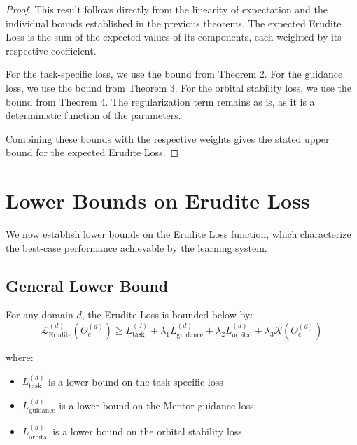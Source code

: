 \begin{proof}
This result follows directly from the linearity of expectation and the individual bounds established in the previous theorems. The expected Erudite Loss is the sum of the expected values of its components, each weighted by its respective coefficient.

For the task-specific loss, we use the bound from Theorem 2. For the guidance loss, we use the bound from Theorem 3. For the orbital stability loss, we use the bound from Theorem 4. The regularization term remains as is, as it is a deterministic function of the parameters.

Combining these bounds with the respective weights gives the stated upper bound for the expected Erudite Loss.
\end{proof}

\section{Lower Bounds on Erudite Loss}

We now establish lower bounds on the Erudite Loss function, which characterize the best-case performance achievable by the learning system.

\subsection{General Lower Bound}

\begin{theorem}
For any domain $d$, the Erudite Loss is bounded below by:
\begin{equation}
\mathcal{L}_{\text{Erudite}}^{(d)}(\Theta_e^{(d)}) \geq L_{\text{task}}^{(d)} + \lambda_1 L_{\text{guidance}}^{(d)} + \lambda_2 L_{\text{orbital}}^{(d)} + \lambda_3 \mathcal{R}(\Theta_e^{(d)})
\end{equation}

where:
\begin{itemize}
    \item $L_{\text{task}}^{(d)}$ is a lower bound on the task-specific loss
    \item $L_{\text{guidance}}^{(d)}$ is a lower bound on the Mentor guidance loss
    \item $L_{\text{orbital}}^{(d)}$ is a lower bound on the orbital stability loss
\end{itemize}
\end{theorem}

